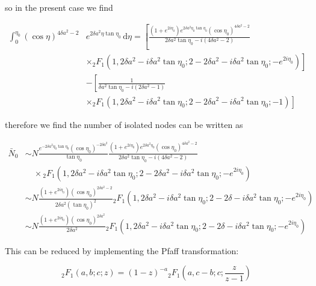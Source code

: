 \documentclass[preprint,notitlepage,amsmath,amssymb,floatfix]{revtex4-1}
\begin{document}
\noindent so in the present case we find

\begin{equation}
\begin{split}
\int_0^{\eta_0}\!\left(\cos\eta\right)^{4\delta a^2 - 2}&e^{2\delta a^2\eta\tan\eta_0}\,\mathrm d\eta = \left[\frac{\left(1+e^{2i\eta_0}\right)e^{2\delta a^2\eta_0\tan\eta_0}\left(\cos\eta_0\right)^{4\delta a^2 - 2}}{2\delta a^2\tan\eta_0 - i\left(4\delta a^2 - 2\right)}\right. \\
&\left.\times{}_2F_1\left(1,2\delta a^2 - i\delta a^2\tan\eta_0;2-2\delta a^2 - i\delta a^2\tan\eta_0;-e^{2i\eta_0}\right)\right] \\
& - \left[\frac{1}{\delta a^2\tan\eta_0 - i\left(2\delta a^2 - 1\right)}\right. \\
&\left.\times{}_2F_1\left(1,2\delta a^2-i\delta a^2\tan\eta_0;2-2\delta a^2-i\delta a^2\tan\eta_0;-1\right)\right]
\end{split}
\end{equation}

\noindent therefore we find the number of isolated nodes can be written as

\begin{equation}
\begin{split}
\bar{N}_0 &\sim N\frac{e^{-2\delta a^2\eta_0\tan\eta_0}\left(\cos\eta_0\right)^{-2\delta a^2}}{\tan\eta_0}\frac{\left(1+e^{2i\eta_0}\right)e^{2\delta a^2\eta_0}\left(\cos\eta_0\right)^{4\delta a^2-2}}{2\delta a^2\tan\eta_0 - i\left(4\delta a^2 - 2\right)} \\
& \quad\times {}_2F_1\left(1,2\delta a^2 - i\delta a^2\tan\eta_0;2-2\delta a^2 - i\delta a^2\tan\eta_0;-e^{2i\eta_0}\right) \\
&\sim N\frac{\left(1+e^{2i\eta_0}\right)\left(\cos\eta_0\right)^{2\delta a^2 - 2}}{2\delta a^2\left(\tan\eta_0\right)^2} {}_2F_1\left(1,2\delta a^2-i\delta a^2\tan\eta_0;2-2\delta-i\delta a^2\tan\eta_0;-e^{2i\eta_0}\right) \\
&\sim N\frac{\left(1+e^{2i\eta_0}\right)\left(\cos\eta_0\right)^{2\delta a^2}}{2\delta a^2} {}_2F_1\left(1,2\delta a^2-i\delta a^2\tan\eta_0;2-2\delta-i\delta a^2\tan\eta_0;-e^{2i\eta_0}\right)
\end{split}
\end{equation}

\noindent This can be reduced by implementing the Pfaff transformation:

\begin{equation}
{}_2F_1\left(a,b;c;z\right) = \left(1-z\right)^{-a} {}_2F_1\left(a,c-b;c;\frac{z}{z-1}\right)
\end{equation}
\end{document}
